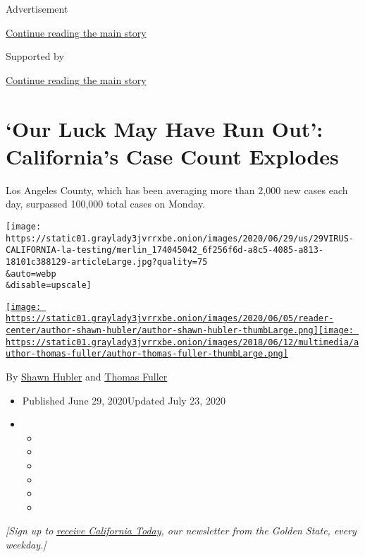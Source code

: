 Advertisement

\protect\hyperlink{after-top}{Continue reading the main story}

Supported by

\protect\hyperlink{after-sponsor}{Continue reading the main story}

\hypertarget{our-luck-may-have-run-out-californias-case-count-explodes}{%
\section{`Our Luck May Have Run Out': California's Case Count
Explodes}\label{our-luck-may-have-run-out-californias-case-count-explodes}}

Los Angeles County, which has been averaging more than 2,000 new cases
each day, surpassed 100,000 total cases on Monday.

\texttt{[image: https://static01.graylady3jvrrxbe.onion/images/2020/06/29/us/29VIRUS-CALIFORNIA-la-testing/merlin\_174045042\_6f256f6d-a8c5-4085-a813-18101c388129-articleLarge.jpg?quality=75\\\&auto=webp\\\&disable=upscale]}

\href{https://www.nytimes3xbfgragh.onion/by/shawn-hubler}{\texttt{[image: https://static01.graylady3jvrrxbe.onion/images/2020/06/05/reader-center/author-shawn-hubler/author-shawn-hubler-thumbLarge.png]}}\href{https://www.nytimes3xbfgragh.onion/by/thomas-fuller}{\texttt{[image: https://static01.graylady3jvrrxbe.onion/images/2018/06/12/multimedia/author-thomas-fuller/author-thomas-fuller-thumbLarge.png]}}

By \href{https://www.nytimes3xbfgragh.onion/by/shawn-hubler}{Shawn
Hubler} and
\href{https://www.nytimes3xbfgragh.onion/by/thomas-fuller}{Thomas
Fuller}

\begin{itemize}
\item
  Published June 29, 2020Updated July 23, 2020
\item
  \begin{itemize}
  \item
  \item
  \item
  \item
  \item
  \item
  \end{itemize}
\end{itemize}

\emph{{[}Sign up to}
\href{https://www.nytimes3xbfgragh.onion/newsletters/california-today}{\emph{receive
California Today}}\emph{, our newsletter from the Golden State, every
weekday.{]}}

